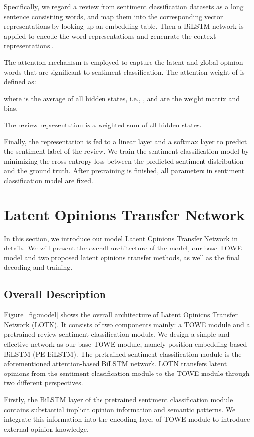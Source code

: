 \documentclass[letterpaper]{article} \usepackage{aaai20}  \usepackage{times}  \usepackage{helvet} \usepackage{courier}  \usepackage[hyphens]{url}  \usepackage{graphicx} \urlstyle{rm} \def\UrlFont{\rm}  \usepackage{graphicx}
\begin{document}
Specifically, we regard a review from sentiment classification datasets as a long sentence  consisiting  words, and map them into the corresponding vector representations  by looking up an embedding table. Then a BiLSTM network is applied to encode the word representations  and genenrate the context representations .

The attention mechanism is employed to capture the latent and global opinion words that are significant to sentiment classification. The attention weight  of  is defined as:

where  is the average of all hidden states, i.e., ,  and  are the weight matrix and bias.

The review representation  is a weighted sum of all hidden states:


Finally, the representation  is fed to a linear layer and a softmax layer to predict the sentiment label of the review. We train the sentiment classification model by minimizing the cross-entropy loss between the predicted sentiment distribution and the ground truth. After pretraining is finished, all parameters in sentiment classification model are fixed.

\section{Latent Opinions Transfer Network}
In this section, we introduce our model Latent Opinions Transfer Network in details. We will present the overall architecture of the model, our base TOWE model and two proposed latent opinions transfer methods, as well as the final decoding and training.

\subsection{Overall Description}
Figure~\ref{fig:model} shows the overall architecture of Latent Opinions Transfer Network (LOTN). It consists of two components mainly: a TOWE module and a pretrained review sentiment classification module. We design a simple and effective network as our base TOWE module,  namely position embedding based BiLSTM (PE-BiLSTM). The pretrained sentiment classification module is the aforementioned attention-based BiLSTM network. LOTN transfers latent opinions from the sentiment classification module to the TOWE module through two different perspectives.

Firstly, the BiLSTM layer of the pretrained sentiment classification module contains substantial implicit opinion information and semantic patterns. We integrate this information into the encoding layer of TOWE module to introduce external opinion knowledge.
\end{document}
